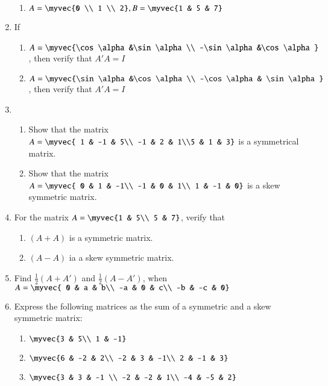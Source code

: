 \documentclass{article}
\theoremstyle{remark}
\begin{document}
\begin{enumerate}
\begin{enumerate}[label=(\roman*)]
\item $A=\myvec {0  \\ 1 \\ 2} , B=\myvec {1 & 5 & 7}$
\end{enumerate}
\item If 
\begin{enumerate}[label=(\roman*)]
\item $A=\myvec {\cos \alpha &\sin \alpha \\ -\sin \alpha &\cos \alpha }$,
then verify that $A'A=I$
\item $A=\myvec{\sin \alpha &\cos \alpha \\ -\cos  \alpha & \sin \alpha}$
, then verify that $A'A=I$
\end{enumerate}
\item
\begin{enumerate}[label=(\roman*)]
\item Show that the matrix $A=\myvec{ 1 & -1 & 5\\ -1 & 2 & 1\\5 & 1 & 3} $ is a symmetrical matrix.
\item Show that the matrix $A=\myvec{ 0 &  1 & -1\\ -1 & 0 & 1\\ 1 & -1 & 0} $ is a skew symmetric matrix.
\end{enumerate} 
\item For the matrix $A=\myvec {1 & 5\\ 5 & 7}$, verify that
\begin{enumerate}[label=(\roman*)]
\item $(A+A)$ is a symmetric matrix.
\item $(A-A)$ ia a skew symmetric matrix.
\end{enumerate}
\item Find $\frac{1}{2} (A+A')$ and $\frac{1}{2} (A-A')$,
when $A=\myvec{ 0 & a & b\\ -a & 0 & c\\ -b & -c & 0}$
\item Express the following matrices as the sum of a symmetric and a skew symmetric matrix:
\begin{enumerate}[label=(\roman*)]
\item $\myvec{3 & 5\\ 1 & -1}$
\item $\myvec{6 & -2 & 2\\ -2 & 3 & -1\\ 2 & -1 & 3}$
\item $\myvec{3 & 3 & -1 \\ -2 & -2 & 1\\ -4 & -5 & 2}$

\end{enumerate}
\end{enumerate}
\end{document}
